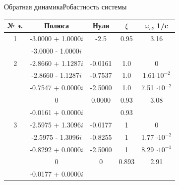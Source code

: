 \begin{frame}{Обратная динамика}{Робастность системы}
\begin{table}[H]
    \begin{tabular}{|c|c|c|c|c|}
        \hline 
        № э.&Полюса & Нули & $\xi$ & $\omega_c$, 1/c \\ \hline 
        1& -3.0000 + 1.0000$i$ & -2.5 & 0.95 & 3.16\\ 
        & -3.0000 - 1.0000$i$ &   &  &  \\ \hline
        2& -2.8660 + 1.1287$i$ & -0.0161  & 1.0 &  0\\ 
        & -2.8660 - 1.1287$i$ &  -0.7537 &1.0 & 1.61$\cdot 10^{-2}$\\ 
        & -0.7547 + 0.0000$i$ &  -2.5000 & 1.0 & 7.51 $\cdot 10^{-2}$\\ 
        & 0 & 0.0000 & 0.93& 3.08 \\ 
        & -0.0161 + 0.0000$i$ &  & 0.93 &  \\ \hline 
        3& -2.5975 + 1.3096$i$ & -0.0177 & 1 & 0\\ 
        & -2.5975 - 1.3096$i$ & -0.8255 & 1& 1.77 $\cdot 10^{-2}$ \\ 
        & -0.8292 + 0.0000$i$ & -2.5000 & 1 & 8.29 $\cdot 10^{-1}$\\ 
        & 0 & 0 & 0.893 & 2.91 \\ 
        & -0.0177 + 0.0000$i$ &  &  &  \\ \hline 
    \end{tabular}
\end{table}

\end{frame}